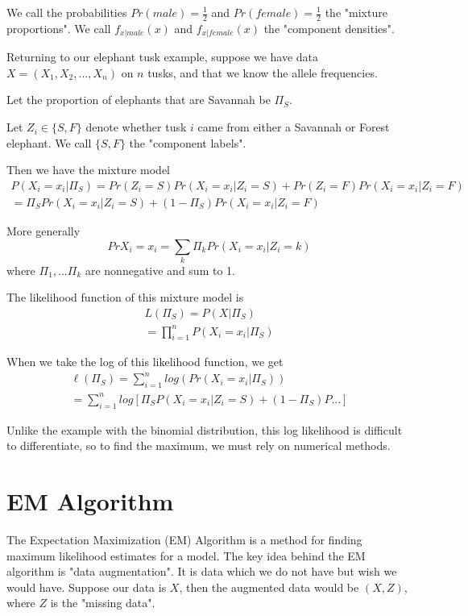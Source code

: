 \documentclass[12pt]{report}
\begin{document}
We call the probabilities $Pr(male) = \frac{1}{2}$ and $Pr(female) = \frac{1}{2}$ the "mixture proportions". We call $f_{x|male}(x)$ and $f_{x|female}(x)$ the "component densities".

Returning to our elephant tusk example, suppose we have data $X = (X_1,X_2,...,X_n)$ on $n$ tusks, and that we know the allele frequencies. 

Let the proportion of elephants that are Savannah be $\Pi_S$. 

Let $Z_i \in \lbrace S,F\rbrace$ denote whether tusk $i$ came from either a Savannah or Forest elephant. We call $\lbrace S,F\rbrace$ the "component labels".

Then we have the mixture model \begin{equation}
\begin{aligned}
P(X_i = x_i|\Pi_S) = Pr(Z_i=S)Pr(X_i = x_i|Z_i=S) + Pr(Z_i = F)Pr(X_i=x_i|Z_i = F) \\
 = \Pi_SPr(X_i = x_i|Z_i=S) + (1-\Pi_S)Pr(X_i=x_i|Z_i = F)
\end{aligned}
\end{equation}

More generally \begin{equation}
Pr{X_i = x_i} = \sum_{k}\Pi_kPr(X_i = x_i|Z_i = k)
\end{equation}
where $\Pi_1,...\Pi_k$ are nonnegative and sum to 1.

The likelihood function of this mixture model is
\begin{equation}
\begin{aligned}
L(\Pi_S) = P(X|\Pi_S)\\=\prod_{i=1}^{n}P(X_i=x_i|\Pi_S)
\end{aligned}
\end{equation}

When we take the log of this likelihood function, we get \begin{equation}
\begin{aligned}
\ell(\Pi_S) = \sum_{i=1}^{n}log(Pr(X_i=x_i|\Pi_S))\\
= \sum_{i=1}^{n}log[\Pi_SP(X_i=x_i|Z_i=S)+(1-\Pi_S)P...]
\end{aligned}
\end{equation}

Unlike the example with the binomial distribution, this log likelihood is difficult to differentiate, so to find the maximum, we must rely on numerical methods.

\section{EM Algorithm}
The Expectation Maximization (EM) Algorithm is a method for finding maximum likelihood estimates for a model. The key idea behind the EM algorithm is "data augmentation". It is data which we do not have but wish we would have. Suppose our data is $X$, then the augmented data would be $(X,Z)$, where $Z$ is the "missing data".
\end{document}
